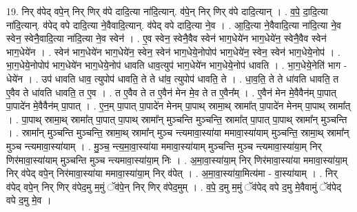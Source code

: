 \documentclass[17pt]{extarticle}
\begin{document}
19. निर् व॑पेद् वपे॒न् निर् णिर् व॑पे दादि॒त्या ना॑दि॒त्यान्. व॑पे॒न् निर् णिर् व॑पे दादि॒त्यान् । . व॒पे॒ दा॒दि॒त्या ना॑दि॒त्यान्. व॑पेद् वपे दादि॒त्या ने॒वैवादि॒त्यान्. व॑पेद् वपे दादि॒त्या ने॒व । . आ॒दि॒त्या ने॒वैवादि॒त्या ना॑दि॒त्या ने॒व स्वेन॒ स्वेनै॒वादि॒त्या ना॑दि॒त्या ने॒व स्वेन॑ । . ए॒व स्वेन॒ स्वेनै॒वैव स्वेन॑ भाग॒धेये॑न भाग॒धेये॑न॒ स्वेनै॒वैव स्वेन॑ भाग॒धेये॑न । . स्वेन॑ भाग॒धेये॑न भाग॒धेये॑न॒ स्वेन॒ स्वेन॑ भाग॒धेये॒नोपोप॑ भाग॒धेये॑न॒ स्वेन॒ स्वेन॑ भाग॒धेये॒नोप॑ । . भा॒ग॒धेये॒नोपोप॑ भाग॒धेये॑न भाग॒धेये॒नोप॑ धावति धाव॒त्युप॑ भाग॒धेये॑न भाग॒धेये॒नोप॑ धावति । . भा॒ग॒धेये॒नेति॑ भाग - धेये॑न । . उप॑ धावति धाव॒ त्युपोप॑ धावति॒ ते ते धा॑व॒ त्युपोप॑ धावति॒ ते । . धा॒व॒ति॒ ते ते धा॑वति धावति॒ त ए॒वैव ते धा॑वति धावति॒ त ए॒व । . त ए॒वैव ते त ए॒वैन॑ मेन मे॒व ते त ए॒वैन᳚म् । . ए॒वैन॑ मेन मे॒वैवैन॑म् पा॒पात् पा॒पादे॑न मे॒वैवैन॑म् पा॒पात् । . ए॒न॒म् पा॒पात् पा॒पादे॑न मेनम् पा॒पाथ् स्रामा॒थ् स्रामा᳚त् पा॒पादे॑न मेनम् पा॒पाथ् स्रामा᳚त् । . पा॒पाथ् स्रामा॒थ् स्रामा᳚त् पा॒पात् पा॒पाथ् स्रामा᳚न् मुञ्चन्ति मुञ्चन्ति॒ स्रामा᳚त् पा॒पात् पा॒पाथ् स्रामा᳚न् मुञ्चन्ति । . स्रामा᳚न् मुञ्चन्ति मुञ्चन्ति॒ स्रामा॒थ् स्रामा᳚न् मुञ्च न्त्यमावा॒स्या॑या ममावा॒स्या॑याम् मुञ्चन्ति॒ स्रामा॒थ् 
स्रामा᳚न् मुञ्च न्त्यमावा॒स्या॑याम् । . मु॒ञ्च॒ न्त्य॒मा॒वा॒स्या॑या ममावा॒स्या॑याम् मुञ्चन्ति मुञ्च न्त्यमावा॒स्या॑या॒म् निर् णिर॑मावा॒स्या॑याम् मुञ्चन्ति मुञ्च न्त्यमावा॒स्या॑या॒म् निः । . अ॒मा॒वा॒स्या॑या॒म् निर् णिर॑मावा॒स्या॑या ममावा॒स्या॑या॒म् निर् व॑पेद् वपे॒न् निर॑मावा॒स्या॑या ममावा॒स्या॑या॒म् निर् व॑पेत् । . अ॒मा॒वा॒स्या॑या॒मित्य॑मा - वा॒स्या॑याम् । . निर् व॑पेद् वपे॒न् निर् णिर् व॑पेद॒मु म॒मुं ॅव॑पे॒न् निर् णिर् व॑पेद॒मुम् । . व॒पे॒ द॒मु म॒मुं ॅव॑पेद् वपे द॒मु मे॒वैवामुं ॅव॑पेद् वपे द॒मु मे॒व । \newline
\end{document}

